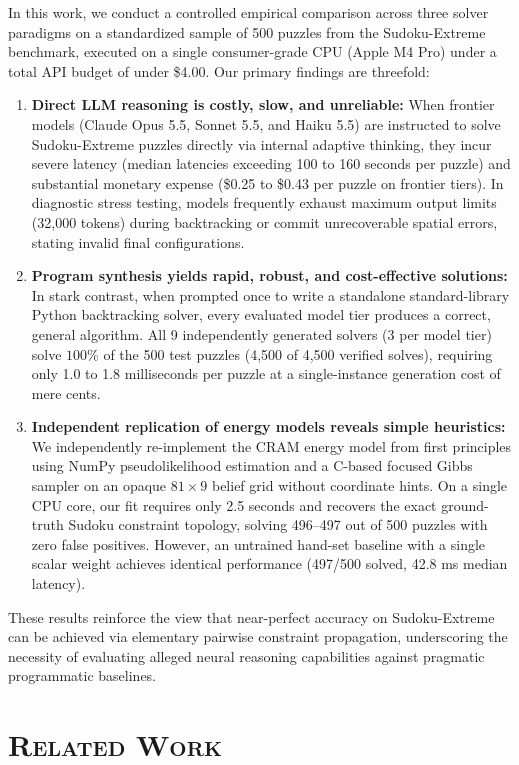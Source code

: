\documentclass{article} %
\begin{document}
In this work, we conduct a controlled empirical comparison across three solver paradigms on a standardized sample of 500 puzzles from the Sudoku-Extreme benchmark, executed on a single consumer-grade CPU (Apple M4 Pro) under a total API budget of under \$4.00. Our primary findings are threefold:
\begin{enumerate}
    \item \textbf{Direct LLM reasoning is costly, slow, and unreliable:} When frontier models (Claude Opus 5.5, Sonnet 5.5, and Haiku 5.5) are instructed to solve Sudoku-Extreme puzzles directly via internal adaptive thinking, they incur severe latency (median latencies exceeding 100 to 160 seconds per puzzle) and substantial monetary expense (\$0.25 to \$0.43 per puzzle on frontier tiers). In diagnostic stress testing, models frequently exhaust maximum output limits (32,000 tokens) during backtracking or commit unrecoverable spatial errors, stating invalid final configurations.
    \item \textbf{Program synthesis yields rapid, robust, and cost-effective solutions:} In stark contrast, when prompted once to write a standalone standard-library Python backtracking solver, every evaluated model tier produces a correct, general algorithm. All 9 independently generated solvers (3 per model tier) solve $100\%$ of the 500 test puzzles (4,500 of 4,500 verified solves), requiring only 1.0 to 1.8 milliseconds per puzzle at a single-instance generation cost of mere cents.
    \item \textbf{Independent replication of energy models reveals simple heuristics:} We independently re-implement the CRAM energy model from first principles using NumPy pseudolikelihood estimation and a C-based focused Gibbs sampler on an opaque $81 \times 9$ belief grid without coordinate hints. On a single CPU core, our fit requires only 2.5 seconds and recovers the exact ground-truth Sudoku constraint topology, solving 496--497 out of 500 puzzles with zero false positives. However, an untrained hand-set baseline with a single scalar weight achieves identical performance (497/500 solved, 42.8 ms median latency).
\end{enumerate}

These results reinforce the view that near-perfect accuracy on Sudoku-Extreme can be achieved via elementary pairwise constraint propagation, underscoring the necessity of evaluating alleged neural reasoning capabilities against pragmatic programmatic baselines.

\section{\textsc{Related Work}}
\label{sec:intro_related_work}
\end{document}
